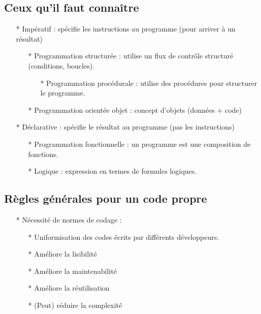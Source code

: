 \documentclass[12pt]{article}
\begin{document}
\subsection{Ceux qu'il faut connaître}
\begin{itemize}
	\item[* ] Impératif : spécifie les instructions au programme (pour arriver à un résultat)
	\begin{itemize}
		\item[* ] Programmation structurée : utilise un flux de contrôle structuré (conditions, boucles).
		\begin{itemize}
			\item[* ] Programmation procédurale : utilise des procédures pour structurer le programme.	
		\end{itemize}
		
		\item[* ] Programmation orientée objet : concept d'objets (données + code)
	\end{itemize}
\item[* ] Déclarative : spécifie le résultat au programme (pas les instructions)
\begin{itemize}
	\item[* ] Programmation fonctionnelle : un programme est une composition de fonctions.
	\item[* ] Logique : expression en termes de formules logiques.
\end{itemize}
\end{itemize}
\subsection{Règles générales pour un code propre}
\begin{itemize}
	\item[* ] Nécessité de normes de codage :
	\begin{itemize}
		\item[* ] Uniformisation des codes écrits par différents développeurs.
		\item[* ] Améliore la lisibilité
		\item[* ] Améliore la maintenabilité
		\item[* ]  Améliore la réutilisation
		\item[* ] (Peut) réduire la complexité
		
	\end{itemize}
\end{itemize}
\end{document}
